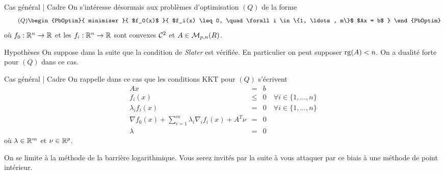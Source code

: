 \documentclass[aspectratio = 169]{beamer}
\begin{document}
\begin{frame}{Cas général | Cadre}
  On s'intéresse désormais aux problèmes d'optimisation $(Q)$ de la
  forme
  \begin{equation}
    \label{Q}
    \tag{$Q$}
    \begin{PbOptim}{
        minimiser
      }{
        $f_0(x)$
      }{
        $f_i(x) \leq 0, \quad \forall i \in \{1, \ldots, m\}$
        $Ax = b$
      }
    \end{PbOptim}
  \end{equation}
  où $f_0 :\mathbb{R}^n \to \mathbb{R}$ et les $f_i: \mathbb{R}^n \to \mathbb{R}$ sont convexes
  $\mathcal{C}^2$ et $A \in \mathcal{M}_{p, n}(R)$. \pause
  \begin{halfshyblock}{Hypothèses}
    On suppose dans la suite que la condition de \emph{Slater} est
    vérifiée. En particulier on peut supposer $\operatorname{rg}(A) < n$. On a
    dualité forte pour $(Q)$ dans ce cas.
  \end{halfshyblock}
\end{frame}

\begin{frame}{Cas général | Cadre}
  On rappelle dans ce cas que les conditions KKT pour $(Q)$ s'écrivent
  \begin{equation}
    \label{KKT-Q}
    \tag{KKT-Q}
    \begin{array}{rcl}
      Ax & = & b \\
      f_i(x) & \leq & 0 \quad \forall i \in \{1, \ldots, n\} \\
      \lambda_if_i(x) & = & 0 \quad \forall i \in \{1, \ldots, n\} \\
      \nabla f_0(x) + \sum_{i=1}^m \lambda_i \nabla_i f_i(x) + A^T\nu & = & 0 \\
      \lambda  & = & 0
    \end{array}
  \end{equation}
  où $\lambda \in \mathbb{R}^m$ et $\nu \in \mathbb{R}^p$.

  \begin{rem}
    On se limite à la méthode de la barrière logarithmique. Vous serez
    invités par la suite à vous attaquer par ce biais à une méthode de
    point intérieur.
  \end{rem}
\end{frame}
\end{document}
